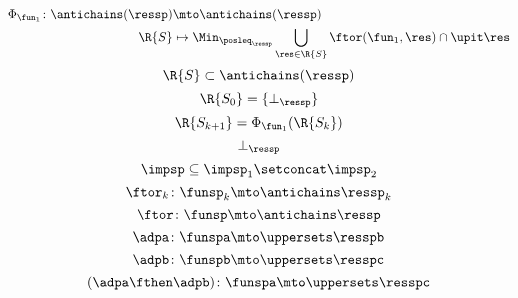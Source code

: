 {\begin{forslides}
\begin{equation*}
            \begin{aligned}
                \Phi_{\fun_1}\colon \antichains(\ressp)&\mto \antichains(\ressp)\\
                \R{S}&\mapsto \Min_{\posleq_\ressp} \bigcup_{\res \in \R{S}}\ftor(\fun_1,\res)\cap \upit \res
            \end{aligned}
        \end{equation*}
        \begin{equation*}
            \label{eq:genfun_11}
            \R{S}\subset \antichains(\ressp)
        \end{equation*}
        \begin{equation*}
            \label{eq:genfun_12}
            \R{S_0}=\{ \bot_\ressp\}
        \end{equation*}
        \begin{equation*}
            \label{eq:genfun_13}
            \R{S_{k+1}}=\Phi_{\fun_1}(\R{S_k})
        \end{equation*}
        \begin{equation*}
            \label{eq:genfun_14}
            \bot_{\ressp}
        \end{equation*}
        \begin{equation*}
            \label{eq:imp_comp}
            \impsp \subseteq \impsp_{1} \setconcat \impsp_{2}
        \end{equation*}
        \begin{equation*}
            \label{eq:dp_mob_4}
            \ftor_k\colon \funsp_k \mto \antichains \ressp_k
        \end{equation*}
        \begin{equation*}
            \label{eq:dp_mob_5}
            \ftor\colon \funsp \mto \antichains \ressp
        \end{equation*}
        \begin{equation*}
            \label{eq:dp_mob_6}
            \adpa\colon \funspa \mto \uppersets \resspb
        \end{equation*}
        \begin{equation*}
            \label{eq:dp_mob_7}
            \adpb\colon \funspb \mto \uppersets \resspc
        \end{equation*}
        \begin{equation*}
            \label{eq:dp_mob_8}
            (\adpa \fthen \adpb) \colon \funspa \mto \uppersets \resspc
        \end{equation*}
    \end{forslides}
}




